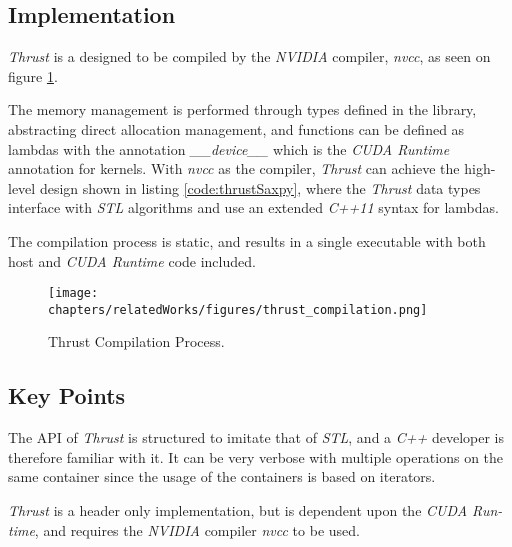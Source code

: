 \subsection{Implementation}
\textit{Thrust} is a designed to be compiled by the \textit{NVIDIA} compiler, \textit{nvcc}, as seen on figure \ref{fig:thrustCompilation}. 

The memory management is performed through types defined in the library, abstracting direct allocation management, and functions can be defined as lambdas with the annotation \textit{\_\_device\_\_} which is the \textit{CUDA Runtime} annotation for kernels. With \textit{nvcc} as the compiler, \textit{Thrust} can achieve the high-level design shown in listing \ref{code:thrustSaxpy}, where the \textit{Thrust} data types interface with \textit{STL} algorithms and use an extended \textit{C++11} syntax for lambdas.

The compilation process is static, and results in a single executable with both host and \textit{CUDA Runtime} code included.
\begin{figure}[H]
\center
\texttt{[image: chapters/relatedWorks/figures/thrust\_compilation.png]}
\caption{Thrust Compilation Process.}
\label{fig:thrustCompilation}
\end{figure}

\subsection{Key Points}
The API of \textit{Thrust} is structured to imitate that of \textit{STL}, and a \textit{C++} developer is therefore familiar with it. It can be very verbose with multiple operations on the same container since the usage of the containers is based on iterators.

\textit{Thrust} is a header only implementation, but is dependent upon the \textit{CUDA Run-time}, and requires the \textit{NVIDIA} compiler \textit{nvcc} to be used.